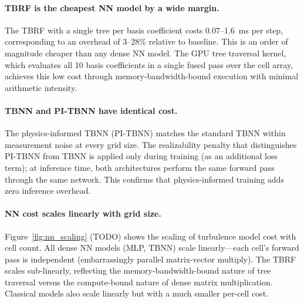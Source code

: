 \paragraph{TBRF is the cheapest NN model by a wide margin.}
The TBRF with a single tree per basis coefficient costs 0.07--1.6~ms per step, corresponding to an overhead of 3--28\% relative to baseline.
This is an order of magnitude cheaper than any dense NN model.
The GPU tree traversal kernel, which evaluates all 10 basis coefficients in a single fused pass over the cell array, achieves this low cost through memory-bandwidth-bound execution with minimal arithmetic intensity.

\paragraph{TBNN and PI-TBNN have identical cost.}
The physics-informed TBNN (PI-TBNN) matches the standard TBNN within measurement noise at every grid size.
The realizability penalty that distinguishes PI-TBNN from TBNN is applied only during training (as an additional loss term); at inference time, both architectures perform the same forward pass through the same network.
This confirms that physics-informed training adds zero inference overhead.

\paragraph{NN cost scales linearly with grid size.}
Figure~\ref{fig:nn_scaling} (TODO) shows the scaling of turbulence model cost with cell count.
All dense NN models (MLP, TBNN) scale linearly---each cell's forward pass is independent (embarrassingly parallel matrix-vector multiply).
The TBRF scales sub-linearly, reflecting the memory-bandwidth-bound nature of tree traversal versus the compute-bound nature of dense matrix multiplication.
Classical models also scale linearly but with a much smaller per-cell cost.

